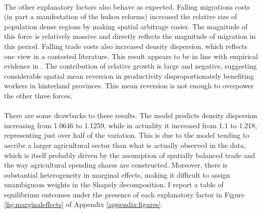 \documentclass[]{article}
\theoremstyle{plain}
\begin{document}
\paragraph*{}
The other explanatory factors also behave as expected. Falling migrations costs (in part a manifestation of the hukou reforms) increased the relative size of population dense regions by making spatial arbitrage easier. The magnitude of this force is relatively massive and directly reflects the magnitude of migration in this period. Falling trade costs also increased density dispersion, which reflects one view in a contested literature. This result appears to be in line with empirical evidence in \cite{bsetal2020}. The contribution of relative growth is large and negative, suggesting considerable spatial mean reversion in productivity disproportionately benefiting workers in hinterland provinces. This mean reversion is not enough to overpower the other three forces. 
\paragraph*{}
There are some drawbacks to these results. The model predicts density dispersion increasing from 1.0646 to 1.1259, while in actuality it increased from 1.1 to 1.218, representing just over half of the variation. This is due to the model tending to ascribe a larger agricultural sector than what is actually observed in the data, which is itself probably driven by the assumption of spatially balanced trade and the way agricultural spending shares are constructed. Moreover, there is substantial heterogeneity in marginal effects, making it difficult to assign unambiguous weights in the Shapely decomposition. I report a table of equilibrium outcomes under the presence of each explanatory factor in Figure \ref{fig:marginaleffects} of Appendix \ref{appendix:figures}.  
\end{document}
